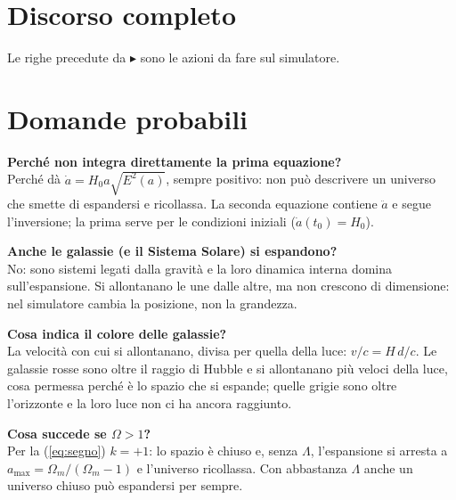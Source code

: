 \documentclass[11pt,a4paper]{article}
\newcommand{\Om}{\Omega_m}
\begin{document}
\section{Discorso completo}\label{app:discorso}
Le righe precedute da {\color{blu}$\blacktriangleright$} sono le azioni da fare sul simulatore.


\section{Domande probabili}

\begin{orale}
\textbf{Perché non integra direttamente la prima equazione?}\\
Perché dà $\dot a=H_0a\sqrt{E^2(a)}$, sempre positivo: non può descrivere un universo che smette di espandersi e ricollassa. La seconda equazione contiene $\ddot a$ e segue l'inversione; la prima serve per le condizioni iniziali ($\dot a(t_0)=H_0$).
\end{orale}

\begin{orale}
\textbf{Anche le galassie (e il Sistema Solare) si espandono?}\\
No: sono sistemi legati dalla gravità e la loro dinamica interna domina sull'espansione. Si allontanano le une dalle altre, ma non crescono di dimensione: nel simulatore cambia la posizione, non la grandezza.
\end{orale}

\begin{orale}
\textbf{Cosa indica il colore delle galassie?}\\
La velocità con cui si allontanano, divisa per quella della luce: $v/c=H\,d/c$. Le galassie rosse sono oltre il raggio di Hubble e si allontanano più veloci della luce, cosa permessa perché è lo spazio che si espande; quelle grigie sono oltre l'orizzonte e la loro luce non ci ha ancora raggiunto.
\end{orale}

\begin{orale}
\textbf{Cosa succede se $\Omega>1$?}\\
Per la (\ref{eq:segno}) $k=+1$: lo spazio è chiuso e, senza $\Lambda$, l'espansione si arresta a $a_{\max}=\Om/(\Om-1)$ e l'universo ricollassa. Con abbastanza $\Lambda$ anche un universo chiuso può espandersi per sempre.
\end{orale}
\end{document}
